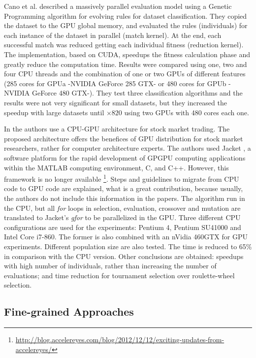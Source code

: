 \documentclass[review]{elsarticle}
\begin{document}
Cano et al. \cite{SpeedingTheEvaluationofGPCano:2012} described a massively parallel evaluation model using a Genetic Programming algorithm for evolving rules for dataset classification. They copied the dataset to the GPU global memory, and evaluated the rules (individuals) for each instance of the dataset in parallel (match kernel). At the end, each successful match was reduced getting each individual fitness (reduction kernel). The implementation, based on CUDA, speedups the fitness calculation phase and greatly reduce the computation time. Results were compared using one, two and four CPU threads and the combination of one or two GPUs of different features (285 cores for GPUa -NVIDIA GeForce 285 GTX- or 480 cores for GPUb -NVIDIA GeForce 480 GTX-). They test three classification algorithms and the results were not very significant for small datasets, but they increased the speedup with large datasets until $\times820$ using two GPUs with 480 cores each one.


In \cite{Contreras:2012:UGA:2150467.2150469} the authors use a CPU-GPU architecture for stock market trading. The proposed architecture offers the benefices of GPU distribution for stock market researchers, rather for computer architecture experts. The authors used Jacket \cite{jacket:Matlab}, a software platform for the rapid development of GPGPU computing applications within the MATLAB computing environment, C, and C++. However, this framework is no longer available \footnote{\url{http://blog.accelereyes.com/blog/2012/12/12/exciting-updates-from-accelereyes/}}. Steps and guidelines to migrate from CPU code to GPU code are explained, what is a great contribution, because usually, the authors do not include this information in the papers. The algorithm run in the CPU, but all  {\em for} loops in selection, evaluation, crossover and mutation are translated to Jacket's {\em gfor} to be parallelized in the GPU. Three different CPU configurations are used for the experiments: Pentium 4, Pentium SU41000 and Intel Core i7-860. The former is also combined with an nVidia 460GTX for GPU experiments. Different population size are also tested. The time is reduced to 65\% in comparison with the CPU version. Other conclusions are obtained: speedups with high number of individuals, rather than increasing the number of evaluations; and time reduction for  tournament selection  over roulette-wheel selection.

\subsection{Fine-grained Approaches}
\end{document}

